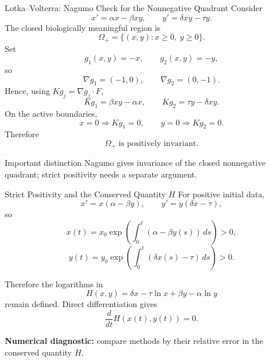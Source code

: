 \documentclass[aspectratio=169,11pt]{beamer}
\begin{document}
\begin{frame}{Lotka--Volterra: Nagumo Check for the Nonnegative Quadrant}
\scriptsize
Consider
\[
x'=\alpha x-\beta xy,\qquad
y'=\delta xy-\tau y.
\]
The closed biologically meaningful region is
\[
\Omega_+=\{(x,y):x\ge0,\ y\ge0\}.
\]
Set
\[
g_1(x,y)=-x,\qquad g_2(x,y)=-y,
\]
so
\[
\nabla g_1=(-1,0),\qquad \nabla g_2=(0,-1).
\]
Hence, using \(Kg_j=\nabla g_j\cdot F\),
\[
Kg_1=\beta xy-\alpha x,\qquad
Kg_2=\tau y-\delta xy.
\]
On the active boundaries,
\[
x=0\Rightarrow Kg_1=0,
\qquad
y=0\Rightarrow Kg_2=0.
\]
Therefore
\[
\boxed{\Omega_+\text{ is positively invariant}.}
\]

\begin{alertblock}{Important distinction}
Nagumo gives invariance of the closed nonnegative quadrant; strict positivity needs a separate argument.
\end{alertblock}
\end{frame}

\begin{frame}{Strict Positivity and the Conserved Quantity \(H\)}
\footnotesize
For positive initial data,
\[
x'=x(\alpha-\beta y),\qquad
y'=y(\delta x-\tau),
\]
so
\[
x(t)=x_0\exp\!\left(\int_0^t(\alpha-\beta y(s))\,ds\right)>0,
\]
\[
y(t)=y_0\exp\!\left(\int_0^t(\delta x(s)-\tau)\,ds\right)>0.
\]

Therefore the logarithms in
\[
\boxed{H(x,y)=\delta x-\tau\ln x+\beta y-\alpha\ln y}
\]
remain defined. Direct differentiation gives
\[
\boxed{\frac{d}{dt}H(x(t),y(t))=0.}
\]

\begin{center}
\textbf{\textcolor{LSUPurple}{Numerical diagnostic:}} compare methods by their relative error in the conserved quantity \(H\).
\end{center}
\end{frame}
\end{document}
